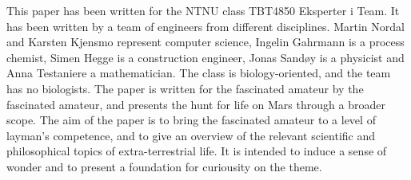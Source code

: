 This paper has been written for the NTNU class TBT4850 Eksperter i Team. It has been written by a team of engineers from different disciplines. Martin Nordal and Karsten Kjensmo represent computer science, Ingelin Gahrmann is a process chemist, Simen Hegge is a construction engineer, Jonas Sandøy is a physicist and Anna Testaniere a mathematician. The class is biology-oriented, and the team has no biologists. The paper is written for the fascinated amateur by the fascinated amateur, and presents the hunt for life on Mars through a broader scope. The aim of the paper is to bring the fascinated amateur to a level of layman's competence, and to give an overview of the relevant scientific and philosophical topics of extra-terrestrial life. It is intended to induce a sense of wonder and to present a foundation for curiousity on the theme. 

